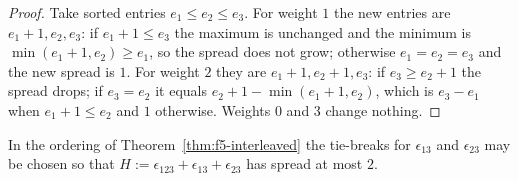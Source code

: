 \begin{proof}
Take sorted entries $e_1 \le e_2 \le e_3$. For weight $1$ the new entries are
$e_1+1, e_2, e_3$: if $e_1 + 1 \le e_3$ the maximum is unchanged and the minimum
is $\min(e_1+1,e_2) \ge e_1$, so the spread does not grow; otherwise
$e_1 = e_2 = e_3$ and the new spread is $1$. For weight $2$ they are
$e_1+1,e_2+1,e_3$: if $e_3 \ge e_2+1$ the spread drops; if $e_3 = e_2$ it equals
$e_2 + 1 - \min(e_1+1,e_2)$, which is $e_3-e_1$ when $e_1+1 \le e_2$ and $1$
otherwise. Weights $0$ and $3$ change nothing.
\end{proof}

\begin{lemma}
\label{lem:f5-tiebreak}
In the ordering of Theorem~\ref{thm:f5-interleaved} the tie-breaks for
$\epsilon_{13}$ and $\epsilon_{23}$ may be chosen so that
$H := \epsilon_{123} + \epsilon_{13} + \epsilon_{23}$ has spread at most $2$.
\end{lemma}

